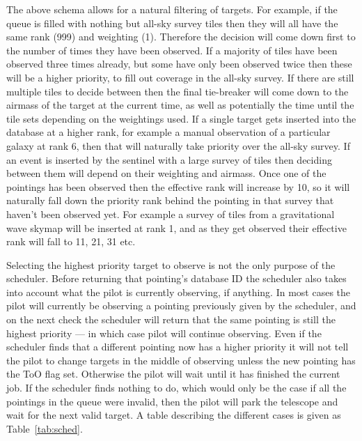 \begin{colsection}
\begin{colsection}
The above schema allows for a natural filtering of targets. For example, if the queue is filled with nothing but all-sky survey tiles then they will all have the same rank (999) and weighting (1). Therefore the decision will come down first to the number of times they have been observed. If a majority of tiles have been observed three times already, but some have only been observed twice then these will be a higher priority, to fill out coverage in the all-sky survey. If there are still multiple tiles to decide between then the final tie-breaker will come down to the airmass of the target at the current time, as well as potentially the time until the tile sets depending on the weightings used. If a single target gets inserted into the database at a higher rank, for example a manual observation of a particular galaxy at rank 6, then that will naturally take priority over the all-sky survey. If an event is inserted by the sentinel with a large survey of tiles then deciding between them will depend on their weighting and airmass. Once one of the pointings has been observed then the effective rank will increase by 10, so it will naturally fall down the priority rank behind the pointing in that survey that haven't been observed yet. For example a survey of tiles from a gravitational wave skymap will be inserted at rank 1, and as they get observed their effective rank will fall to 11, 21, 31 etc.

Selecting the highest priority target to observe is not the only purpose of the scheduler. Before returning that pointing's database ID the scheduler also takes into account what the pilot is currently observing, if anything. In most cases the pilot will currently be observing a pointing previously given by the scheduler, and on the next check the scheduler will return that the same pointing is still the highest priority --- in which case pilot will continue observing. Even if the scheduler finds that a different pointing now has a higher priority it will not tell the pilot to change targets in the middle of observing unless the new pointing has the ToO flag set. Otherwise the pilot will wait until it has finished the current job. If the scheduler finds nothing to do, which would only be the case if all the pointings in the queue were invalid, then the pilot will park the telescope and wait for the next valid target. A table describing the different cases is given as Table~\ref{tab:sched}.



\end{colsection}
\end{colsection}

